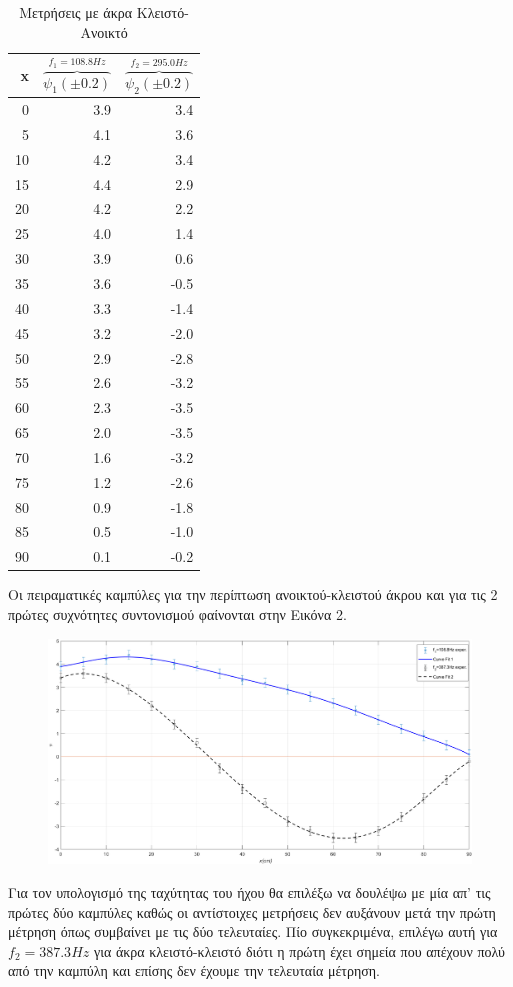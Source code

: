 \documentclass[a4paper]{article}
\begin{document}
\begin{table}[h!]
\centering 
\caption{Μετρήσεις με άκρα Κλειστό-Ανοικτό}
\begin{tabular}{r|r|r}
x & $\overbrace{\psi_1(\pm 0.2)}^{f_1=108.8Hz}$ & $\overbrace{\psi_2 (\pm0.2)}^{f_2=295.0Hz}$ \\ 
\hline\hline
0&3.9&3.4\\ 
5&4.1&3.6\\
10&4.2&3.4\\
15&4.4&2.9\\
20&4.2&2.2\\
25&4.0&1.4\\
30&3.9&0.6\\
35&3.6&-0.5\\
40&3.3&-1.4\\
45&3.2&-2.0\\
50&2.9&-2.8\\
55&2.6&-3.2\\
60&2.3&-3.5\\
65&2.0&-3.5\\
70&1.6&-3.2\\
75&1.2&-2.6\\
80&0.9&-1.8\\
85&0.5&-1.0\\
90&0.1&-0.2
\end{tabular}
\end{table}
Οι πειραματικές καμπύλες για την περίπτωση ανοικτού-κλειστού άκρου και για τις 2 πρώτες συχνότητες συντονισμού φαίνονται στην Εικόνα 2.

\begin{figure}[h!]
\caption{ }
\includegraphics[scale=0.5]{plotopen.png}
\end{figure}
 
Για τον υπολογισμό της ταχύτητας του ήχου θα επιλέξω να δουλέψω με μία απ' τις πρώτες δύο καμπύλες καθώς οι αντίστοιχες μετρήσεις δεν αυξάνουν μετά την πρώτη μέτρηση όπως συμβαίνει με τις δύο τελευταίες. Πίο συγκεκριμένα, επιλέγω αυτή για $f_2=387.3Hz$ για άκρα κλειστό-κλειστό διότι η πρώτη έχει σημεία που απέχουν πολύ από την καμπύλη και επίσης δεν έχουμε την τελευταία μέτρηση.
\end{document}
